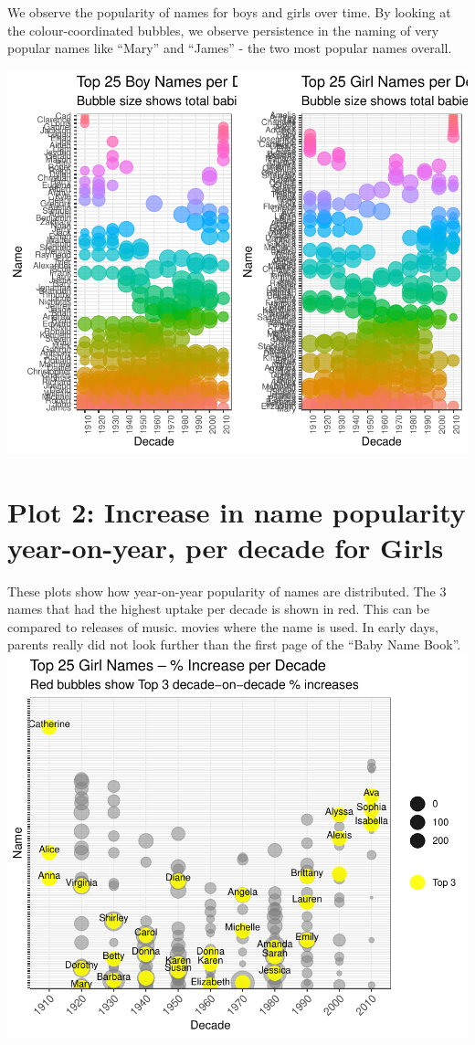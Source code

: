 \documentclass[11pt,preprint]{elsarticle}
\numberwithin{equation}{section}
\numberwithin{figure}{section}
\numberwithin{table}{section}
\begin{document}
We observe the popularity of names for boys and girls over time. By
looking at the colour-coordinated bubbles, we observe persistence in the
naming of very popular names like ``Mary'' and ``James'' - the two most
popular names overall.

\begin{center}\includegraphics{Question1_files/figure-latex/unnamed-chunk-1-1} \end{center}
\newpage

\section{Plot 2: Increase in name popularity year-on-year, per decade
for
Girls}\label{plot-2-increase-in-name-popularity-year-on-year-per-decade-for-girls}

These plots show how year-on-year popularity of names are distributed.
The 3 names that had the highest uptake per decade is shown in red. This
can be compared to releases of music. movies where the name is used. In
early days, parents really did not look further than the first page of
the ``Baby Name Book''.
\includegraphics{Question1_files/figure-latex/unnamed-chunk-2-1.pdf}
\newpage
\end{document}
